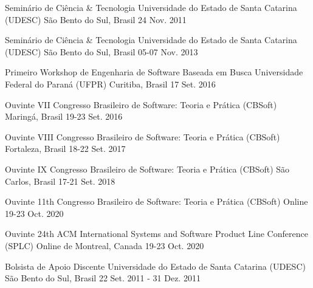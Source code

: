 \begin{cventries}
	\cventry
	{Seminário de Ciência \& Tecnologia} %
	{Universidade do Estado de Santa Catarina (UDESC)} %
	{São Bento do Sul, Brasil} %
	{24 Nov. 2011} %
	{}
	
	\cventry
	{Seminário de Ciência \& Tecnologia} %
	{Universidade do Estado de Santa Catarina (UDESC)} %
	{São Bento do Sul, Brasil} %
	{05-07 Nov. 2013} %
	{}
	
	\cventry
	{Primeiro Workshop de Engenharia de Software Baseada em Busca} %
	{Universidade Federal do Paraná (UFPR)} %
	{Curitiba, Brasil} %
	{17 Set. 2016} %
	{}
	
	\cventry
	{Ouvinte} %
	{VII Congresso Brasileiro de Software: Teoria e Prática (CBSoft)} %
	{Maringá, Brasil} %
	{19-23 Set. 2016} %
	{}
	
	\cventry
	{Ouvinte} %
	{VIII Congresso Brasileiro de Software: Teoria e Prática (CBSoft)} %
	{Fortaleza, Brasil} %
	{18-22 Set. 2017} %
	{}
	
	\cventry
	{Ouvinte} %
	{IX Congresso Brasileiro de Software: Teoria e Prática (CBSoft)} %
	{São Carlos, Brasil} %
	{17-21 Set. 2018} %
	{}
	
	\cventry
	{Ouvinte} %
	{11th Congresso Brasileiro de Software: Teoria e Prática (CBSoft)} %
	{Online} %
	{19-23 Oct. 2020} %
	{}
	
	\cventry
	{Ouvinte} %
	{24th ACM International Systems and Software Product Line Conference (SPLC)} %
	{Online de Montreal, Canada} %
	{19-23 Oct. 2020} %
	{}

\end{cventries}


\begin{cventries}
	\cventry
	{Bolsista de Apoio Discente} %
	{Universidade do Estado de Santa Catarina (UDESC)} %
	{São Bento do Sul, Brasil} %
	{22 Set. 2011 - 31 Dez. 2011} %
	{}
\end{cventries}